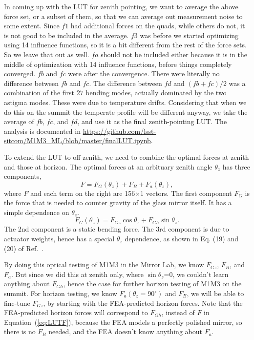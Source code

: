 \documentclass [twoside,openbib,12pt]{article}
\newcommand{\beq}{\begin{equation}}
\newcommand{\eeq}{\end{equation}}
\begin{document}
In coming up with the LUT for zenith pointing, we want to average the
above force set, or a subset of them, so that we can average out
measurement noise to some extent.
Since $f1$ had additional forces on the quads, while others do not, it is not good to be
included in the average.
$f3$ was before we started optimizing using 14 influence functions, so
it is a bit different from the rest of the force sets. So we leave
that out as well.
$fa$ should not be included either because it is in the middle of
optimization with 14 influence functions, before things
completely converged.
$fb$ and $fc$ were after the convergence. There were literally no
difference between $fb$ and $fc$.
The difference between $fd$ and $(fb+fc)/2$ was a combination of the first
27 bending modes, actually dominated by the two astigma modes.
These were due to temperature drifts.
Considering that when we do this on the summit the temperate profile
will be different anyway, we take the average of $fb$, $fc$, and $fd$,
and use it as the final zenith-pointing LUT.
The analysis is documented in \url{https://github.com/lsst-sitcom/M1M3_ML/blob/master/finalLUT.ipynb}.

To extend the LUT to off zenith, we need to combine the optimal forces
at zenith and those at horizon. The optimal forces at an arbituary
zenith angle $\theta_z$ has three components,
\beq
F = F_G(\theta_z) + F_B + F_a(\theta_z),
\label{eq:LUTF}
\eeq
where $F$ and each term on the right are 156$\times$1 vectors.
The first component $F_G$ is the force that is needed to counter
gravity of the glass mirror itself. It has a simple dependence on $\theta_z$.
\beq
F_G(\theta_z)  = F_{Gz} \cos \theta_z + F_{Gh} \sin \theta_z.
\eeq
The 2nd component is a static bending force.
The 3rd component is due to actuator weights, hence has a special
$\theta_z$ dependence, as shown in Eq. (19) and (20) of Ref.~\cite{m1m3initF}.

By doing this optical testing of M1M3 in the Mirror Lab, we know
$F_{Gz}$, $F_B$, and $F_a$. But since we did this at zenith only,
where $\sin\theta_z$=0, we couldn't learn anything about $F_{Gh}$,
hence the case for further horizon testing of M1M3 on the summit. For
horizon testing, we know $F_a(\theta_z = 90^\circ)$ and $F_B$, we will
be able to fine-tune $F_{Gz}$, by starting with the FEA-predicted
horizon forces. Note that the FEA-predicted horizon forces will
correspond to $F_{Gh} $, instead of $F$ in Equation~(\ref{eq:LUTF}), because the FEA
models a perfectly polished mirror, so there is no $F_B$ needed, and
the FEA doesn't know anything about $F_a$.
\end{document}

